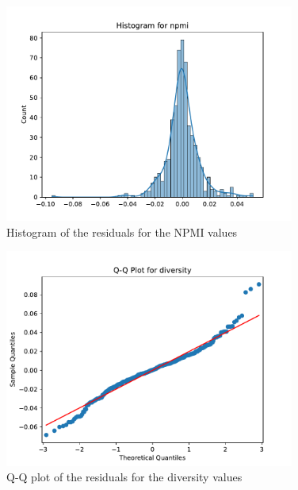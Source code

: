 \begin{figure}[h]
    \centering
    \includegraphics[width=0.85\textwidth]{figures/histogram_npmi.pdf}
    \caption{Histogram of the residuals for the NPMI values}
    \label{fig:histogram_npmi}
\end{figure}

\begin{figure}[h]
    \centering
    \includegraphics[width=0.85\textwidth]{figures/qqplot_diversity.pdf}
    \caption{Q-Q plot of the residuals for the diversity values}
    \label{fig:qqplot_diversity}
\end{figure}

